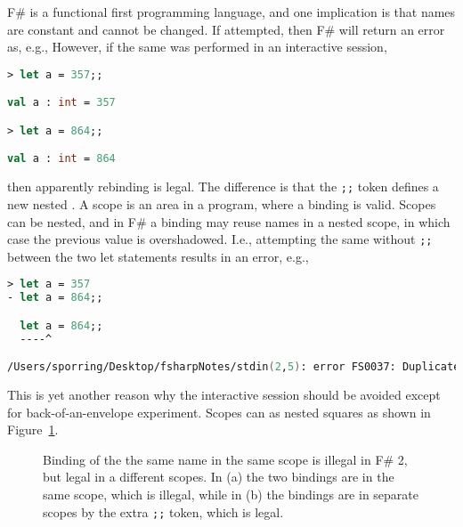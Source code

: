 F\# is a functional first programming language, and one implication is that names are constant and cannot be changed. If attempted, then F\# will return an error as, e.g.,
%
%
However, if the same was performed in an interactive session,
\begin{lstlisting}[language=fsharp,caption=fsharpi]
> let a = 357;;

val a : int = 357

> let a = 864;;

val a : int = 864
\end{lstlisting}
then apparently rebinding is legal. The difference is that the \lstinline|;;| token defines a new nested . A scope is an area in a program, where a binding is valid. Scopes can be nested, and in F\# a binding may reuse names in a nested scope, in which case the previous value is overshadowed. I.e., attempting the same without \lstinline|;;| between the two let statements results in an error, e.g.,
\begin{lstlisting}[language=fsharp,caption=fsharpi]
> let a = 357
- let a = 864;;

  let a = 864;;
  ----^

/Users/sporring/Desktop/fsharpNotes/stdin(2,5): error FS0037: Duplicate definition of value 'a'
\end{lstlisting}
This is yet another reason why the interactive session should be avoided except for back-of-an-envelope experiment.  Scopes can as nested squares as shown in Figure~\ref{fig:scope}.
\begin{figure}
  \centering
  \caption{Binding of the the same name in the same scope is illegal in F\# 2, but legal in a different scopes. In (a) the two bindings are in the same scope, which is illegal, while in (b) the bindings are in separate scopes by the extra \lstinline|;;| token, which is legal.}
  \label{fig:scope}
\end{figure}

